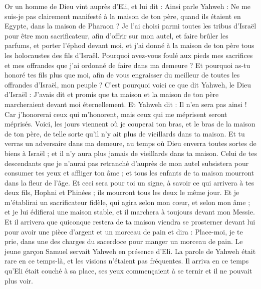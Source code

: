 \begin{multicols}{2}
Or un homme de Dieu vint auprès d'Eli, et lui dit : Ainsi parle Yahweh : Ne me suis-je pas clairement manifesté à la maison de ton père, quand ils étaient en Egypte, dans la maison de Pharaon ?
Je l'ai choisi parmi toutes les tribus d'Israël pour être mon sacrificateur, afin d'offrir sur mon autel, et faire brûler les parfums, et porter l'éphod devant moi, et j'ai donné à la maison de ton père tous les holocaustes des fils d'Israël.
Pourquoi avez-vous foulé aux pieds mes sacrifices et mes offrandes que j'ai ordonné de faire dans ma demeure ? Et pourquoi as-tu honoré tes fils plus que moi, afin de vous engraisser du meilleur de toutes les offrandes d'Israël, mon peuple ?
C'est pourquoi voici ce que dit Yahweh, le Dieu d'Israël : J'avais dit et promis que ta maison et la maison de ton père marcheraient devant moi éternellement. Et Yahweh dit : Il n'en sera pas ainsi ! Car j'honorerai ceux qui m'honorent, mais ceux qui me méprisent seront méprisés.
Voici, les jours viennent où je couperai ton bras, et le bras de la maison de ton père, de telle sorte qu'il n'y ait plus de vieillards dans ta maison.
Et tu verras un adversaire dans ma demeure, au temps où Dieu enverra toutes sortes de biens à Israël ; et il n'y aura plus jamais de vieillards dans ta maison.
Celui de tes descendants que je n'aurai pas retranché d'auprès de mon autel subsistera pour consumer tes yeux et affliger ton âme ; et tous les enfants de ta maison mourront dans la fleur de l'âge.
Et ceci sera pour toi un signe, à savoir ce qui arrivera à tes deux fils, Hophni et Phinées ; ils mourront tous les deux le même jour.
Et je m'établirai un sacrificateur fidèle, qui agira selon mon cœur, et selon mon âme ; et je lui édifierai une maison stable, et il marchera à toujours devant mon Messie.
Et il arrivera que quiconque restera de ta maison viendra se prosterner devant lui pour avoir une pièce d'argent et un morceau de pain et dira : Place-moi, je te prie, dans une des charges du sacerdoce pour manger un morceau de pain.
\VerseOne{}Le jeune garçon Samuel servait Yahweh en présence d'Eli. La parole de Yahweh était rare en ce temps-là, et les visions n'étaient pas fréquentes.
Il arriva en ce temps qu'Eli était couché à sa place, ses yeux commençaient à se ternir et il ne pouvait plus voir.

\end{multicols}
